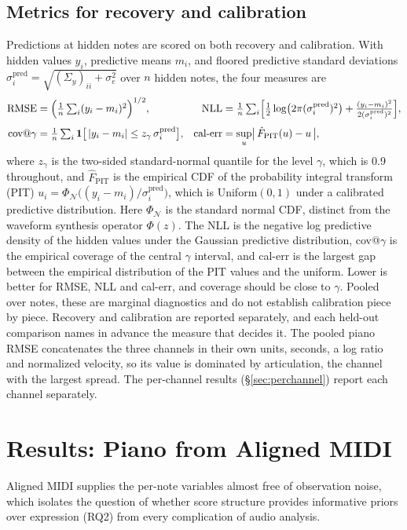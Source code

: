 \documentclass[11pt,a4paper]{report}
\newcommand{\N}{\mathcal{N}}
\newcommand{\Sy}{\Sigma_y}             %
\begin{document}
\section{Metrics for recovery and calibration}\label{sec:metrics}
Predictions at hidden notes are scored on both recovery and calibration.
With hidden values $y_i$, predictive means $m_i$, and floored predictive
standard deviations $\sigma_i^{\mathrm{pred}} = \sqrt{(\Sy)_{ii} + \sigma_e^2}$
over $n$ hidden notes, the four measures are
\begin{align}
  \text{RMSE} &= \Bigl( \tfrac1n \textstyle\sum_i (y_i - m_i)^2 \Bigr)^{1/2},
  &
  \text{NLL} &= \tfrac1n \textstyle\sum_i \Bigl[ \tfrac12 \log\bigl(2\pi (\sigma_i^{\mathrm{pred}})^2\bigr)
        + \tfrac{(y_i - m_i)^2}{2 (\sigma_i^{\mathrm{pred}})^2} \Bigr],
  \\[3pt]
  \text{cov}@\gamma &= \tfrac1n \textstyle\sum_i \mathbf{1}\bigl[\, |y_i - m_i| \le z_{\gamma}\, \sigma_i^{\mathrm{pred}} \bigr],
  &
  \text{cal-err} &= \sup_u \bigl|\, \hat F_{\mathrm{PIT}}(u) - u \,\bigr|,
\end{align}
where $z_\gamma$ is the two-sided standard-normal quantile for the level
$\gamma$, which is 0.9 throughout, and $\hat F_{\mathrm{PIT}}$ is the
empirical CDF of the probability integral transform (PIT)
$u_i = \Phi_{\N}\bigl((y_i - m_i)/\sigma_i^{\mathrm{pred}}\bigr)$, which is
Uniform$(0,1)$ under a calibrated predictive distribution. Here $\Phi_{\N}$
is the standard normal CDF, distinct from the waveform synthesis operator
$\Phi(z)$. The NLL is the negative log predictive density of the hidden
values under the Gaussian predictive distribution, cov@$\gamma$ is the
empirical coverage of the central $\gamma$ interval, and cal-err is the
largest gap between the empirical distribution of the PIT values and the
uniform. Lower is better for RMSE, NLL and cal-err, and coverage should be
close to $\gamma$. Pooled over notes, these are marginal diagnostics and do
not establish calibration piece by piece. Recovery and calibration are reported separately, and
each held-out comparison names in advance the measure that decides it. The
pooled piano RMSE concatenates the three channels in their own units,
seconds, a log ratio and normalized velocity, so its value is dominated by
articulation, the channel with the largest spread. The per-channel results
(\S\ref{sec:perchannel}) report each channel separately.


\chapter{Results: Piano from Aligned MIDI}\label{ch:results}
Aligned MIDI supplies the per-note variables almost free of observation
noise, which isolates the question of whether score structure provides
informative priors over expression (RQ2) from every complication of audio
analysis.
\end{document}
